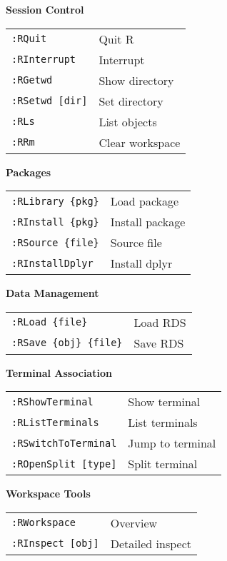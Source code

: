 \documentclass[10pt,landscape,a4paper]{article}
\begin{document}
\begin{multicols}{3}
\vspace{3pt}
\textbf{Session Control}\\
\begin{tabular}{@{}L{1.8cm}L{1.4cm}@{}}
\texttt{:RQuit} & Quit R \\
\texttt{:RInterrupt} & Interrupt \\
\texttt{:RGetwd} & Show directory \\
\texttt{:RSetwd [dir]} & Set directory \\
\texttt{:RLs} & List objects \\
\texttt{:RRm} & Clear workspace \\
\end{tabular}

\vspace{3pt}
\textbf{Packages}\\
\begin{tabular}{@{}L{1.8cm}L{1.4cm}@{}}
\texttt{:RLibrary \{pkg\}} & Load package \\
\texttt{:RInstall \{pkg\}} & Install package \\
\texttt{:RSource \{file\}} & Source file \\
\texttt{:RInstallDplyr} & Install dplyr \\
\end{tabular}

\columnbreak

\textbf{Data Management}\\
\begin{tabular}{@{}L{1.8cm}L{1.4cm}@{}}
\texttt{:RLoad \{file\}} & Load RDS \\
\texttt{:RSave \{obj\} \{file\}} & Save RDS \\
\end{tabular}

\vspace{3pt}
\textbf{Terminal Association}\\
\begin{tabular}{@{}L{1.8cm}L{1.4cm}@{}}
\texttt{:RShowTerminal} & Show terminal \\
\texttt{:RListTerminals} & List terminals \\
\texttt{:RSwitchToTerminal} & Jump to terminal \\
\texttt{:ROpenSplit [type]} & Split terminal \\
\end{tabular}

\vspace{3pt}
\textbf{Workspace Tools}\\
\begin{tabular}{@{}L{1.8cm}L{1.4cm}@{}}
\texttt{:RWorkspace} & Overview \\
\texttt{:RInspect [obj]} & Detailed inspect \\
\end{tabular}


\end{multicols}
\end{document}
